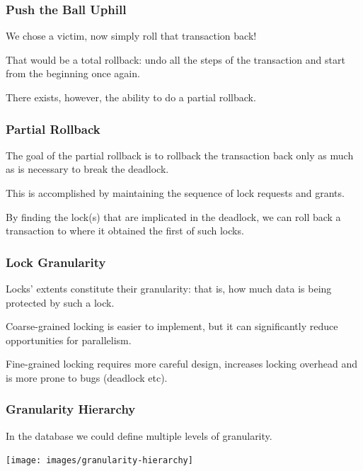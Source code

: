 \begin{frame}
\frametitle{Push the Ball Uphill}

We chose a victim, now simply roll that transaction back! 

That would be a total rollback: undo all the steps of the transaction and start from the beginning once again. 

There exists, however, the ability to do a \alert{partial rollback}. 

\end{frame}

\begin{frame}
\frametitle{Partial Rollback}

The goal of the partial rollback is to rollback the transaction back only as much as is necessary to break the deadlock.  

This is accomplished by maintaining the sequence of lock requests and grants.

 By finding the lock(s) that are implicated in the deadlock, we can roll back a transaction to where it obtained the first of such locks.

\end{frame}



\begin{frame}
\frametitle{Lock Granularity}

Locks' extents constitute their \alert{granularity}: that is, how much data is being protected by such a lock.

\alert{Coarse-grained} locking is easier to implement, but it can significantly reduce opportunities for parallelism. 

\alert{Fine-grained locking} requires more careful design, increases locking overhead and is more prone to bugs (deadlock etc).

 
\end{frame}

\begin{frame}
\frametitle{Granularity Hierarchy}
In the database we could define multiple levels of granularity. 

\begin{center}
\texttt{[image: images/granularity-hierarchy]}
\end{center}


\end{frame}

